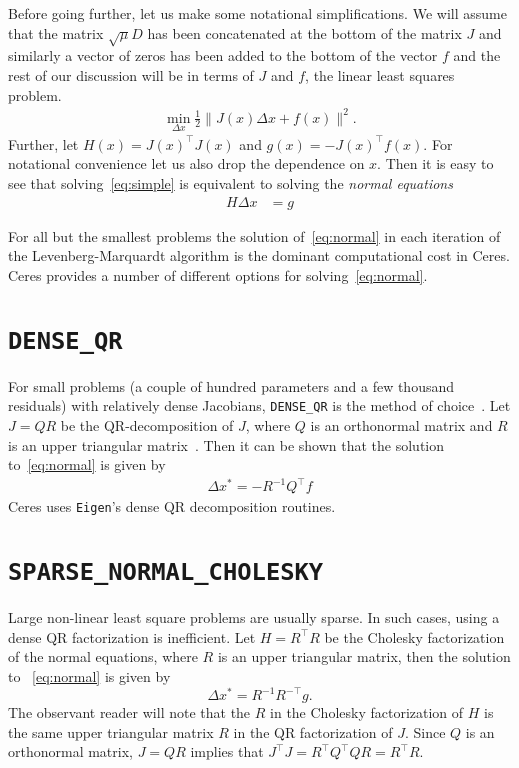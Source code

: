 Before going further, let us make some notational simplifications. We will assume that the matrix $\sqrt{\mu} D$ has been concatenated at the bottom of the matrix $J$ and similarly a vector of zeros has been added to the bottom of the vector $f$ and the rest of our discussion will be in terms of $J$ and $f$, \ie the linear least squares problem.
\begin{align}
 \min_{\Delta x} \frac{1}{2} \|J(x)\Delta x + f(x)\|^2 .
 \label{eq:simple}
\end{align}
Further, let $H(x)= J(x)^\top J(x)$ and $g(x) = -J(x)^\top  f(x)$. For notational convenience let us also drop the dependence on $x$. Then it is easy to see that solving~\eqref{eq:simple} is equivalent to solving the {\em normal equations}
\begin{align}
H \Delta x  &= g \label{eq:normal}
\end{align}

For all but the smallest problems the solution of~\eqref{eq:normal} in each iteration of the Levenberg-Marquardt algorithm is the dominant computational cost in Ceres. Ceres provides a number of different options for solving~\eqref{eq:normal}.


\section{\texttt{DENSE\_QR}}
For small problems (a couple of hundred parameters and a few thousand residuals) with relatively dense Jacobians, \texttt{DENSE\_QR} is the method of choice~\cite{bjorck1996numerical}. Let $J = QR$ be the QR-decomposition of $J$, where $Q$ is an orthonormal matrix and $R$ is an upper triangular matrix~\cite{trefethen1997numerical}. Then it can be shown that the solution to~\eqref{eq:normal} is given by
\begin{align}
	\Delta x^* = -R^{-1}Q^\top f
\end{align}
Ceres uses \texttt{Eigen}'s dense QR decomposition routines.


\section{\texttt{SPARSE\_NORMAL\_CHOLESKY}}
Large non-linear least square problems are usually sparse. In such cases, using a dense QR factorization is inefficient. Let $H = R^\top R$ be the Cholesky factorization of the normal equations, where $R$ is an upper triangular matrix, then the  solution to ~\eqref{eq:normal} is given by
\begin{equation}
	\Delta x^* = R^{-1} R^{-\top} g.
\end{equation}
The observant reader will note that the $R$ in the Cholesky factorization of $H$ is the same upper triangular matrix $R$ in the QR factorization of $J$. Since $Q$ is an orthonormal matrix, $J=QR$ implies that $J^\top J = R^\top Q^\top Q R = R^\top R$.



